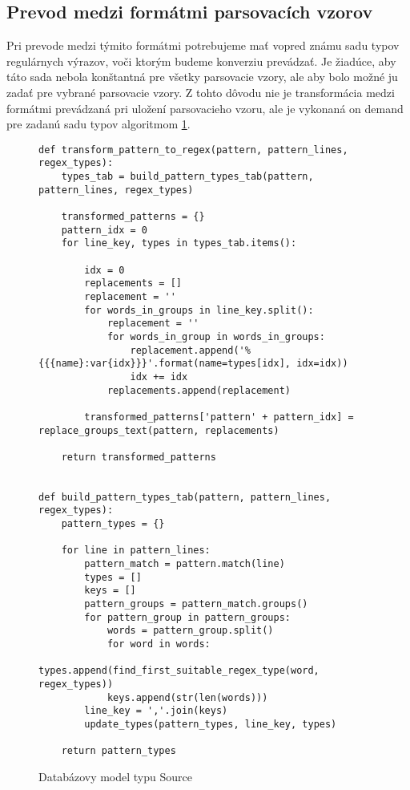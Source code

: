 \subsection{Prevod medzi formátmi parsovacích vzorov}
\label{sec:format-transformation}

Pri prevode medzi týmito formátmi potrebujeme mať vopred známu sadu typov regulárnych výrazov, voči ktorým budeme konverziu prevádzať. Je žiadúce, aby táto sada nebola konštantná pre všetky parsovacie vzory, ale aby bolo možné ju zadať pre vybrané parsovacie vzory. Z tohto dôvodu nie je transformácia medzi formátmi prevádzaná pri uložení parsovacieho vzoru, ale je vykonaná on demand pre zadanú sadu typov algoritmom \ref{fig:pattern-transformation}.

\begin{figure}[htbp]
\centering
\begin{minipage}{0.9\textwidth}
\lstset{tabsize=4,columns=flexible,breaklines=true,breakatwhitespace=true, showstringspaces=false}
\begin{lstlisting}
def transform_pattern_to_regex(pattern, pattern_lines, regex_types):
    types_tab = build_pattern_types_tab(pattern, pattern_lines, regex_types)

    transformed_patterns = {}
    pattern_idx = 0
    for line_key, types in types_tab.items():

        idx = 0
        replacements = []
        replacement = ''
        for words_in_groups in line_key.split():
            replacement = ''
            for words_in_group in words_in_groups:
                replacement.append('%{{{name}:var{idx}}}'.format(name=types[idx], idx=idx))
                idx += idx
            replacements.append(replacement)
            
        transformed_patterns['pattern' + pattern_idx] = replace_groups_text(pattern, replacements)

    return transformed_patterns


def build_pattern_types_tab(pattern, pattern_lines, regex_types):
    pattern_types = {}

    for line in pattern_lines:
        pattern_match = pattern.match(line)
        types = []
        keys = []
        pattern_groups = pattern_match.groups()
        for pattern_group in pattern_groups:
            words = pattern_group.split()
            for word in words:
                types.append(find_first_suitable_regex_type(word, regex_types))
            keys.append(str(len(words)))
        line_key = ','.join(keys)
        update_types(pattern_types, line_key, types)

    return pattern_types
\end{lstlisting} 		
\end{minipage} 
\caption{Databázovy model typu Source}
\label{fig:pattern-transformation}
\end{figure}

